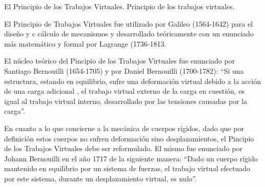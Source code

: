 \begin{myblock}{El Principio de los Trabajos Virtuales.}
Principio de los trabajos virtuales.

\vspace{2mm} El Principio de Trabajos Virtuales fue utilizado por Galileo (1564-1642) para el diseño y c cálculo de mecanismos y desarrollado teóricamente con un enunciado más matemático y formal por Lagrange (1736-1813. 

\vspace{2mm} El núcleo teórico del Pincipio  de los Trabajos Virtuales fue enunciado por Santiago Bernouilli (1654-1705) y por Daniel Bernouilli (1700-1782): “Si una estructura, estando en equilibrio, sufre una deformación virtual debido a la acción de una carga adicional , el trabajo virtual externo de la carga en cuestión, es igual al trabajo virtual interno, desarrollado por las tensiones causadas por la carga”. 

\vspace{2mm} En cuanto a lo que concierne a la mecánica de cuerpos rígidos, dado que por definición estos cuerpos no sufren deformación sino desplazamientos, el Pincipio  de los Trabajos Virtuales debe ser reformulado. El mismo fue enunciado por Johann Bernouilli en el año 1717 de la siguiente manera: “Dado un cuerpo rígido mantenido en equilibrio por un sistema de fuerzas, el trabajo virtual efectuado por este sistema, durante un desplazamiento virtual, es nulo”. 
\end{myblock}


